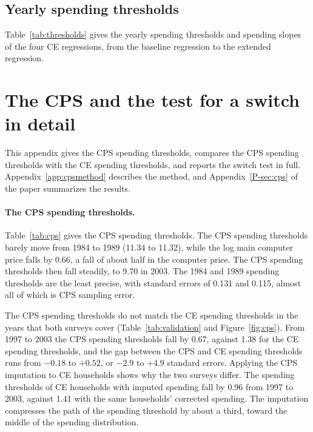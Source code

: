\documentclass[11pt]{article}
\begin{document}
\subsection{Yearly spending thresholds}
\label{app:thresholdtable}

Table~\ref{tab:thresholds} gives the yearly spending thresholds and spending slopes of the four CE regressions, from the baseline regression to the extended regression.

\begin{table}[!htbp]
\centering
\caption{Yearly spending thresholds $\hat\tau_t$, the log long-run spending at which a household with average location and traits has a 50\% chance of owning a computer (replicate standard errors), and spending slopes $\hat\beta_t$, from the baseline regression to the extended regression. $\ell_t$ is the main log computer price relative to 1994. 2013 has the first quarter only.}
\label{tab:thresholds}
\resizebox{\textwidth}{!}{}
\end{table}

\section{The CPS and the test for a switch in detail}
\label{sec:cpsfull}

This appendix gives the CPS spending thresholds, compares the CPS spending thresholds with the CE spending thresholds, and reports the switch test in full. Appendix~\ref{app:cpsmethod} describes the method, and Appendix~\ref{P-sec:cps} of the paper summarizes the results.

\paragraph{The CPS spending thresholds.} Table~\ref{tab:cps} gives the CPS spending thresholds. The CPS spending thresholds barely move from 1984 to 1989 (11.34 to 11.32), while the log main computer price falls by 0.66, a fall of about half in the computer price. The CPS spending thresholds then fall steadily, to 9.70 in 2003. The 1984 and 1989 spending thresholds are the least precise, with standard errors of 0.131 and 0.115, almost all of which is CPS sampling error.

The CPS spending thresholds do not match the CE spending thresholds in the years that both surveys cover (Table~\ref{tab:validation} and Figure~\ref{fig:cps}). From 1997 to 2003 the CPS spending thresholds fall by 0.67, against 1.38 for the CE spending thresholds, and the gap between the CPS and CE spending thresholds runs from $-0.18$ to $+0.52$, or $-2.9$ to $+4.9$ standard errors. Applying the CPS imputation to CE households shows why the two surveys differ. The spending thresholds of CE households with imputed spending fall by 0.96 from 1997 to 2003, against 1.41 with the same households' corrected spending. The imputation compresses the path of the spending threshold by about a third, toward the middle of the spending distribution.
\end{document}
